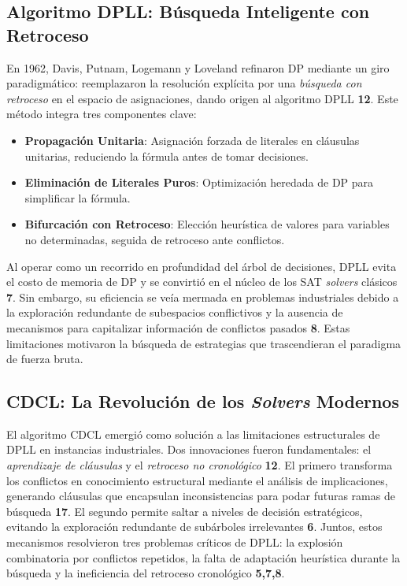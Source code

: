 \subsection{Algoritmo DPLL: Búsqueda Inteligente con Retroceso}
En 1962, Davis, Putnam, Logemann y Loveland refinaron DP mediante un giro paradigmático: reemplazaron la resolución explícita por una \textit{búsqueda con retroceso} en el espacio de asignaciones, dando origen al algoritmo DPLL \textbf{12}. Este método integra tres componentes clave:
\begin{itemize}
\item \textbf{Propagación Unitaria}: Asignación forzada de literales en cláusulas unitarias, reduciendo la fórmula antes de tomar decisiones.
\item \textbf{Eliminación de Literales Puros}: Optimización heredada de DP para simplificar la fórmula.
\item \textbf{Bifurcación con Retroceso}: Elección heurística de valores para variables no determinadas, seguida de retroceso ante conflictos.
\end{itemize}

Al operar como un recorrido en profundidad del árbol de decisiones, DPLL evita el costo de memoria de DP y se convirtió en el núcleo de los SAT \textit{solvers} clásicos \textbf{7}. Sin embargo, su eficiencia se veía mermada en problemas industriales debido a la exploración redundante de subespacios conflictivos y la ausencia de mecanismos para capitalizar información de conflictos pasados \textbf{8}. Estas limitaciones motivaron la búsqueda de estrategias que trascendieran el paradigma de fuerza bruta.

\subsection{CDCL: La Revolución de los \textit{Solvers} Modernos}
\label{subsec:cdcl}

El algoritmo CDCL emergió como solución a las limitaciones estructurales de DPLL en instancias industriales. Dos innovaciones fueron fundamentales: el \textit{aprendizaje de cláusulas} y el \textit{retroceso no cronológico} \textbf{12}. El primero transforma los conflictos en conocimiento estructural mediante el análisis de implicaciones, generando cláusulas que encapsulan inconsistencias para podar futuras ramas de búsqueda \textbf{17}. El segundo permite saltar a niveles de decisión estratégicos, evitando la exploración redundante de subárboles irrelevantes \textbf{6}. Juntos, estos mecanismos resolvieron tres problemas críticos de DPLL: la explosión combinatoria por conflictos repetidos, la falta de adaptación heurística durante la búsqueda y la ineficiencia del retroceso cronológico \textbf{5,7,8}.

